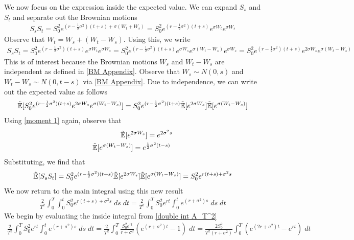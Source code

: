 \documentclass[reqno]{amsart}
\newcommand{\rE}[1]{\tilde{\E}[#1]}
\begin{document}
We now focus on the expression inside the expected value. 
We can expand $S_s$ and $S_t$ and separate out the Brownian motions
\begin{align}
     S_{s} S_{t} 
     = S_0^2 e^{(r-\frac{1}{2}\sigma^2)(t+s)+\sigma(W_t+W_s)}
     = S_0^2 e^{(r-\frac{1}{2}\sigma^2)(t+s)} e^{\sigma W_t} e^{\sigma W_s}
\end{align}
Observe that $W_t = W_s + (W_t - W_s)$. Using this, we write
\begin{align}
     S_{s} S_{t} 
     = S_0^2 e^{(r-\frac{1}{2}\sigma^2)(t+s)} e^{\sigma W_t} e^{\sigma W_s}
     = S_0^2 e^{(r-\frac{1}{2}\sigma^2)(t+s)} e^{\sigma W_s} e^{\sigma (W_t - W_s)} e^{\sigma W_s}
     = S_0^2 e^{(r-\frac{1}{2}\sigma^2)(t+s)} e^{2 \sigma W_s} e^{\sigma (W_t - W_s)}
\end{align}
This is of interest because the Brownian motions $W_s$ and $W_t - W_s$ are independent as defined in \eqref{BM Appendix}.
Observe that $W_s \sim N(0, s)$ and $W_t - W_s \sim N(0, t-s)$ via \eqref{BM Appendix}. 
Due to independence, we can write out the expected value as follows
\begin{align}
     \rE{S_0^2 e^{(r-\frac{1}{2}\sigma^2)(t+s)}e^{2 \sigma W_s} e^{\sigma (W_t - W_s)}}
     = S_0^2 e^{(r-\frac{1}{2}\sigma^2)(t+s)} \rE{e^{2 \sigma W_s}} \rE{e^{\sigma (W_t - W_s)}}
\end{align}
Using \eqref{moment 1} again, observe that
\begin{align}
     \rE{e^{2 \sigma W_s}} = e^{2 \sigma^2 s} \\
     \rE{e^{\sigma (W_t - W_s)}} = e^{\frac{1}{2} \sigma^2 (t-s)} \;
\end{align}
Substituting, we find that
\begin{align}
     \rE{S_{s} S_{t}} 
     = S_0^2 e^{(r-\frac{1}{2}\sigma^2)(t+s)} \rE{e^{2 \sigma W_s}} \rE{e^{\sigma (W_t - W_s)}}
     = S_0^2 e^{r(t+s)+\sigma^2s}
\end{align}
We now return to the main integral using this new result
\begin{align} \label{double int A_T^2}
     \frac{2}{T^2} \int_0^T \int_0^t S_0^2 e^{r(t+s)+\sigma^2s} \; ds \; dt = \frac{2}{T^2} \int_0^T S_0^2 e^{rt} \int_0^t e^{(r + \sigma^2)s} \; ds \; dt
\end{align}
We begin by evaluating the inside integral from \eqref{double int A_T^2}
\begin{align}
     \frac{2}{T^2} \int_0^T S_0^2 e^{rt} \int_0^t e^{(r + \sigma^2)s} \; ds \; dt = \frac{2}{T^2} \int_0^T \frac{S_0^2 e^{rt}}{r + \sigma^2} (e^{(r+\sigma^2)t} - 1) \; dt = \frac{2 S_0^2}{T^2(r + \sigma^2)} \int_0^T  (e^{(2r+\sigma^2)t} - e^{rt}) \; dt
\end{align}
\end{document}
